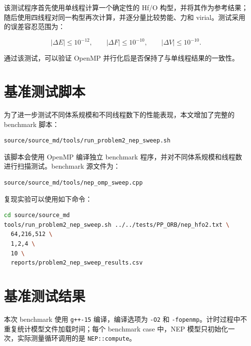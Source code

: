 \documentclass[11pt]{article}
\begin{document}
该测试程序首先使用单线程计算一个确定性的 Hf/O 构型，并将其作为参考结果；随后使用四线程对同一构型再次计算，并逐分量比较势能、力和 virial。测试采用的误差容忍范围为：

\[
  |\Delta E| \le 10^{-12}, \qquad
  |\Delta F| \le 10^{-10}, \qquad
  |\Delta V| \le 10^{-10}.
\]

通过该测试，可以验证 OpenMP 并行化后是否保持了与单线程结果的一致性。

\section{基准测试脚本}

为了进一步测试不同体系规模和不同线程数下的性能表现，本文增加了完整的 benchmark 脚本：

\begin{lstlisting}[language=bash]
source/source_md/tools/run_problem2_nep_sweep.sh
\end{lstlisting}

该脚本会使用 OpenMP 编译独立 benchmark 程序，并对不同体系规模和线程数进行扫描测试。benchmark 源文件为：

\begin{lstlisting}
source/source_md/tools/nep_omp_sweep.cpp
\end{lstlisting}

复现实验可以使用如下命令：

\begin{lstlisting}[language=bash]
cd source/source_md
tools/run_problem2_nep_sweep.sh ../../tests/PP_ORB/nep_hfo2.txt \
  64,216,512 \
  1,2,4 \
  10 \
  reports/problem2_nep_sweep_results.csv
\end{lstlisting}

\section{基准测试结果}

本次 benchmark 使用 \texttt{g++-15} 编译，编译选项为 \texttt{-O2} 和 \texttt{-fopenmp}。计时过程中不重复统计模型文件加载时间；每个 benchmark case 中，NEP 模型只初始化一次，实际测量循环调用的是 \texttt{NEP::compute}。
\end{document}

